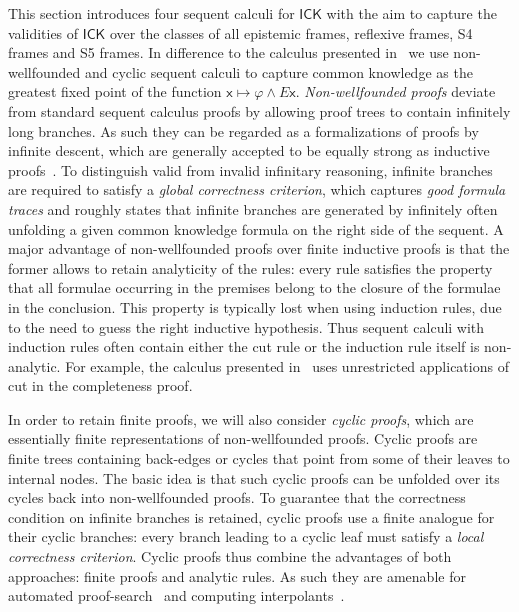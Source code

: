\documentclass{myifcolog}
\newcommand{\E}{E}
\newcommand{\ICK}{\mathsf{ICK}}
\numberwithin{theorem}{section}
\begin{document}
This section introduces four sequent calculi for $\ICK$ with the aim to capture the validities of $\ICK$ over the classes of all epistemic frames, reflexive frames, S4 frames and S5 frames. In difference to the calculus presented in~\cite{jager-intuitionistic_2016} we use non-wellfounded and cyclic sequent calculi to capture common knowledge as the greatest fixed point of the function $\mathsf{x} \mapsto \varphi \wedge \E \mathsf{x}$. \emph{Non-wellfounded proofs} deviate from standard sequent calculus proofs by allowing proof trees to contain infinitely long branches. As such they can be regarded as a formalizations of proofs by infinite descent, which are generally accepted to be equally strong as inductive proofs~\cite{brotherston}. To distinguish valid from invalid infinitary reasoning, infinite branches are required to satisfy a \emph{global correctness criterion}, which captures \emph{good formula traces} and roughly states that infinite branches are generated by infinitely often unfolding a given common knowledge formula on the right side of the sequent. A major advantage of non-wellfounded proofs over finite inductive proofs is that the former allows to retain analyticity of the rules: every rule satisfies the property that all formulae occurring in the premises belong to the closure of the formulae in the conclusion. This property is typically lost when using induction rules, due to the need to guess the right inductive hypothesis. Thus sequent calculi with induction rules often contain either the cut rule or the induction rule itself is non-analytic. For example, the calculus presented in~\cite{jager-intuitionistic_2016} uses unrestricted applications of cut in the completeness proof. 

In order to retain finite proofs, we will also consider \emph{cyclic proofs}, which are essentially finite representations of non-wellfounded proofs. Cyclic proofs are finite trees containing back-edges or cycles that point from some of their leaves to internal nodes. The basic idea is that such cyclic proofs can be unfolded over its cycles back into non-wellfounded proofs. To guarantee that the correctness condition on infinite branches is retained, cyclic proofs use a finite analogue for their cyclic branches: every branch leading to a cyclic leaf must satisfy a \emph{local correctness criterion}. Cyclic proofs thus combine the advantages of both approaches: finite proofs and analytic rules. As such they are amenable for automated proof-search~\cite{rooduijn_analytic_2022} and computing interpolants~\cite{Afshari_lyndon_2022, Shamkanov_circular_2014}.
\end{document}
